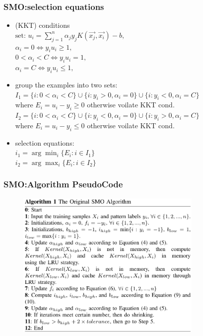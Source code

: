 \documentclass{beamer}
\begin{document}
\begin{frame}
	\frametitle{SMO:selection equations}	 

	\begin{itemize}
		\item (KKT) conditions \\
				$ \text{set: } u_i = \sum_{j=1}^{n}\alpha_jy_jK(\vec{x_j},\vec{x_i})-b,$ \\
				$ \alpha_i=0 \Leftrightarrow y_iu_i \geq 1, $ \\
				$ 0 < \alpha_i < C \Leftrightarrow y_iu_i = 1,$ \\
				$ \alpha_i=C \Leftrightarrow y_iu_i \leq 1,$
		\item group the examples into two sets: \\
				$I_1=\{i:0<\alpha_i<C\}\cup\{i:y_i>0,\alpha_i=0\}\cup\{i:y_i<0,\alpha_i=C\}$ \\
				where $E_i=u_i-y_i \geq 0$ otherwise voilate KKT cond.  \\
				
				$I_2=\{i:0<\alpha_i<C\}\cup\{i:y_i<0,\alpha_i=0\}\cup\{i:y_i>0,\alpha_i=C\}$ \\	
				where $E_i=u_i-y_i \leq 0$ otherwise voilate KKT cond.
				
		\item selection equations: \\
			$i_1 =\arg\min_{i}\{E_i:i \in I_1\}$ \\
			$i_2 =\arg\max_{i}\{E_i:i \in I_2\}$
	\end{itemize}	
\end{frame}

\begin{frame}
	\frametitle{SMO:Algorithm PseudoCode}	
	\begin{figure}
		\includegraphics[width=0.8\textwidth]{figs/smo_algo.png}
		
	\end{figure} 
\end{frame}
\end{document}
